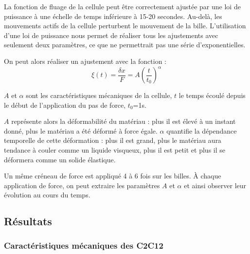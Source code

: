 	 
La fonction de fluage de la cellule peut être correctement ajustée par une loi de puissance à une échelle de temps inférieure à 15-20 secondes. Au-delà, les mouvements actifs de la cellule perturbent le mouvement de la bille.  
L'utilisation d'une loi de puissance nous permet de réaliser tous les ajustements avec seulement deux paramètres, ce que ne permettrait pas une série d'exponentielles. 

On peut alors réaliser un ajustement avec la fonction : 
$$ \xi (t) = \frac{\delta x}{F}=A \left( \frac{t}{t_0} \right)^{\alpha}$$

$A$ et $\alpha$ sont les caractéristiques mécaniques de la cellule, $t$ le temps écoulé depuis le début de l'application du pas de force, $t_0$=1s. 

% 
 
 $A$ représente alors la déformabilité du matériau : plus il est élevé à un instant donné, plus le matériau a été déformé à force égale. 
 $\alpha$ quantifie la dépendance temporelle de cette déformation : plus il est grand, plus le matériau aura tendance à couler comme un liquide visqueux, plus il est petit et plus il se déformera comme un solide élastique. 

Un même créneau de force est appliqué 4 à 6 fois sur les billes. 
À chaque application de force, on peut extraire les paramètres $A$ et $\alpha$ et ainsi observer leur évolution au cours du temps. 


\subsection{Résultats}



\subsubsection{Caractéristiques mécaniques des C2C12}

